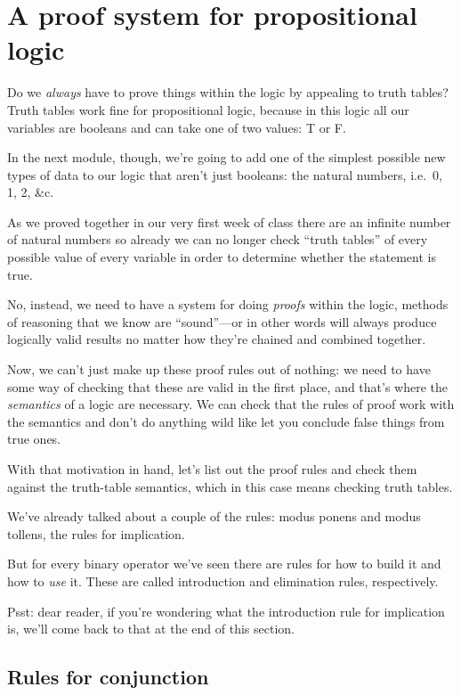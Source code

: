 \documentclass[11pt]{article}
\begin{document}
\section{A proof system for propositional logic}

Do we \emph{always} have to prove things within the logic by appealing to truth tables? Truth tables work fine for propositional logic, because in this logic all our variables are booleans and can take one of two values: T or F.

In the next module, though, we're going to add one of the simplest possible new types of data to our logic that aren't just booleans: the natural numbers, i.e.\ 0, 1, 2, \&c.

As we proved together in our very first week of class there are an infinite number of natural numbers so already we can no longer check ``truth tables'' of every possible value of every variable in order to determine whether the statement is true.

No, instead, we need to have a system for doing \emph{proofs} within the logic, methods of reasoning that we know are ``sound''---or in other words will always produce logically valid results no matter how they're chained and combined together.

Now, we can't just make up these proof rules out of nothing: we need to have some way of checking that these are valid in the first place, and that's where the \emph{semantics} of a logic are necessary. We can check that the rules of proof work with the semantics and don't do anything wild like let you conclude false things from true ones.

With that motivation in hand, let's list out the proof rules and check them against the truth-table semantics, which in this case means checking truth tables.

We've already talked about a couple of the rules: modus ponens and modus tollens, the rules for implication.

But for every binary operator we've seen there are rules for how to build it and how to \emph{use} it. These are called introduction and elimination rules, respectively.

Psst: dear reader, if you're wondering what the introduction rule for implication is, we'll come back to that at the end of this section.

\subsection{Rules for conjunction}
\end{document}
